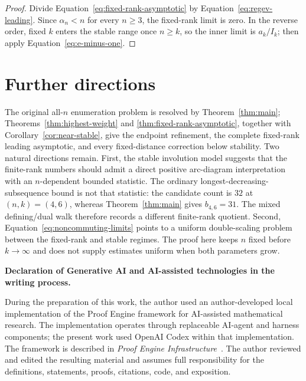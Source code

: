\documentclass[11pt]{article}
\theoremstyle{definition}
\begin{document}
\begin{proof}
Divide Equation~\eqref{eq:fixed-rank-asymptotic} by
Equation~\eqref{eq:regev-leading}.  Since $\alpha_n<n$ for every $n\ge3$,
the fixed-rank limit is zero.  In the reverse order, fixed $k$ enters the
stable range once $n\ge k$, so the inner limit is $a_k/I_k$; then apply
Equation~\eqref{eq:e-minus-one}.
\end{proof}

\section{Further directions}

The original all-$n$ enumeration problem is resolved by
Theorem~\ref{thm:main}; Theorems~\ref{thm:highest-weight} and
\ref{thm:fixed-rank-asymptotic}, together with
Corollary~\ref{cor:near-stable}, give the endpoint refinement, the complete
fixed-rank leading asymptotic, and every fixed-distance correction below
stability.  Two natural directions remain.  First, the stable
involution model suggests that the finite-rank
numbers should admit a direct positive arc-diagram interpretation with an
$n$-dependent bounded statistic.  The ordinary
longest-decreasing-subsequence bound is not that statistic: the candidate
count is $32$ at $(n,k)=(4,6)$, whereas Theorem~\ref{thm:main} gives
$b_{4,6}=31$.  The mixed defining/dual walk therefore records a different
finite-rank quotient.  Second,
Equation~\eqref{eq:noncommuting-limits} points to a uniform double-scaling
problem between the fixed-rank and stable regimes.  The proof here keeps $n$
fixed before $k\to\infty$ and does not supply estimates uniform when both
parameters grow.

\begingroup
\footnotesize
\medskip
\noindent\textbf{Declaration of Generative AI and AI-assisted technologies in
the writing process.}\par
During the preparation of this work, the author used an author-developed local
implementation of the Proof Engine framework for AI-assisted mathematical
research.  The implementation operates through replaceable AI-agent and
harness components; the present work used OpenAI Codex within that
implementation.  The framework is described in \emph{Proof Engine
Infrastructure}~\cite{LiProofEngine2026}.  The author reviewed and edited the
resulting material and assumes full responsibility for the definitions,
statements, proofs, citations, code, and exposition.



\endgroup
\end{document}
